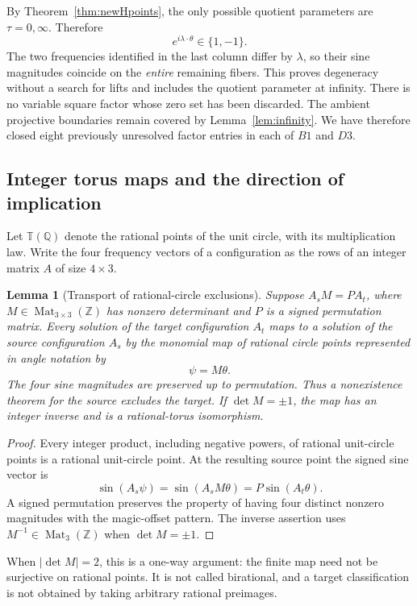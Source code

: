 \documentclass[11pt,letterpaper]{article}
\newtheorem{lemma}[theorem]{Lemma}
\theoremstyle{definition}\newtheorem{definition}[theorem]{Definition}
\theoremstyle{remark}\newtheorem{remark}[theorem]{Remark}
\newcommand{\Q}{\mathbb Q}\newcommand{\Z}{\mathbb Z}\newcommand{\R}{\mathbb R}
\begin{document}
By Theorem~\ref{thm:newHpoints}, the only possible quotient parameters are $\tau=0,\infty$. Therefore
\[
 e^{i\lambda\cdot\theta}\in\{1,-1\}.
\]
The two frequencies identified in the last column differ by $\lambda$, so their sine magnitudes coincide on the \emph{entire} remaining fibers. This proves degeneracy without a search for lifts and includes the quotient parameter at infinity. There is no variable square factor whose zero set has been discarded. The ambient projective boundaries remain covered by Lemma~\ref{lem:infinity}. We have therefore closed eight previously unresolved factor entries in each of $B1$ and $D3$.

\subsection{Integer torus maps and the direction of implication}
Let $\mathbb T(\Q)$ denote the rational points of the unit circle, with its multiplication law. Write the four frequency vectors of a configuration as the rows of an integer matrix $A$ of size $4\times3$.
\begin{lemma}[Transport of rational-circle exclusions]\label{lem:torustransport}
Suppose $A_sM=PA_t$, where $M\in\operatorname{Mat}_{3\times3}(\Z)$ has nonzero determinant and $P$ is a signed permutation matrix. Every solution of the target configuration $A_t$ maps to a solution of the source configuration $A_s$ by the monomial map of rational circle points represented in angle notation by
\[
 \psi=M\theta.
\]
The four sine magnitudes are preserved up to permutation. Thus a nonexistence theorem for the source excludes the target. If $\det M=\pm1$, the map has an integer inverse and is a rational-torus isomorphism.
\end{lemma}
\begin{proof}
Every integer product, including negative powers, of rational unit-circle points is a rational unit-circle point. At the resulting source point the signed sine vector is
\[
 \sin(A_s\psi)=\sin(A_sM\theta)=P\sin(A_t\theta).
\]
A signed permutation preserves the property of having four distinct nonzero magnitudes with the magic-offset pattern. The inverse assertion uses $M^{-1}\in\operatorname{Mat}_3(\Z)$ when $\det M=\pm1$.
\end{proof}
When $|\det M|=2$, this is a one-way argument: the finite map need not be surjective on rational points. It is not called birational, and a target classification is not obtained by taking arbitrary rational preimages.
\end{document}
